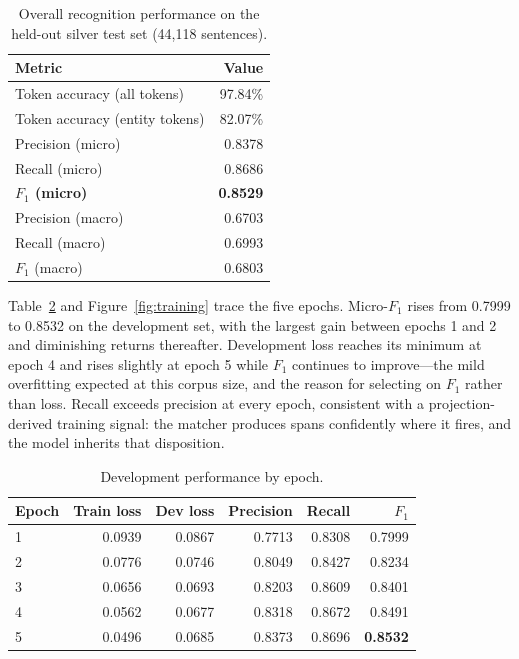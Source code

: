 \documentclass[acmsmall,screen,review]{acmart}
\begin{document}
\begin{table}[htbp]
\centering
\caption{Overall recognition performance on the held-out silver test set
(44,118 sentences).}
\label{tab:ner_overall}
\begin{tabular}{lr}
\hline
\textbf{Metric} & \textbf{Value} \\
\hline
Token accuracy (all tokens)     & 97.84\% \\
Token accuracy (entity tokens)  & 82.07\% \\
Precision (micro)               & 0.8378 \\
Recall (micro)                  & 0.8686 \\
\textbf{$F_1$ (micro)}          & \textbf{0.8529} \\
Precision (macro)               & 0.6703 \\
Recall (macro)                  & 0.6993 \\
$F_1$ (macro)                   & 0.6803 \\
\hline
\end{tabular}
\end{table}

Table~\ref{tab:ner_epochs} and Figure~\ref{fig:training} trace the five epochs.
Micro-$F_1$ rises from 0.7999 to 0.8532 on the development set, with the largest
gain between epochs 1 and 2 and diminishing returns thereafter. Development loss
reaches its minimum at epoch 4 and rises slightly at epoch 5 while $F_1$
continues to improve---the mild overfitting expected at this corpus size, and
the reason for selecting on $F_1$ rather than loss. Recall exceeds precision at
every epoch, consistent with a projection-derived training signal: the matcher
produces spans confidently where it fires, and the model inherits that
disposition.

\begin{table}[htbp]
\centering
\caption{Development performance by epoch.}
\label{tab:ner_epochs}
\begin{tabular}{lrrrrr}
\hline
\textbf{Epoch} & \textbf{Train loss} & \textbf{Dev loss} & \textbf{Precision} & \textbf{Recall} & \textbf{$F_1$} \\
\hline
1 & 0.0939 & 0.0867 & 0.7713 & 0.8308 & 0.7999 \\
2 & 0.0776 & 0.0746 & 0.8049 & 0.8427 & 0.8234 \\
3 & 0.0656 & 0.0693 & 0.8203 & 0.8609 & 0.8401 \\
4 & 0.0562 & 0.0677 & 0.8318 & 0.8672 & 0.8491 \\
5 & 0.0496 & 0.0685 & 0.8373 & 0.8696 & \textbf{0.8532} \\
\hline
\end{tabular}
\end{table}
\end{document}
